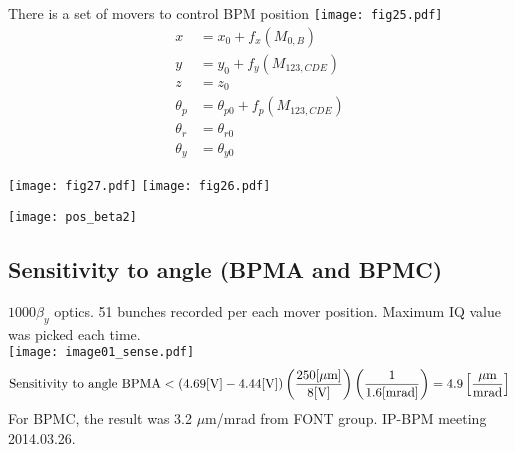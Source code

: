 {\tiny There is a set of movers to control BPM position}\vspace{-0.5cm}
\centering
\texttt{[image: fig25.pdf]} 
\begin{align*}
 x &= x_0+f_x(M_{0,B})\\
 y &= y_0+f_y(M_{123,CDE})\\
 z &= z_0\\
 \theta_p &= \theta_{p0}+f_p(M_{123,CDE})\\
 \theta_r &= \theta_{r0}\\
 \theta_y &= \theta_{y0}
\end{align*}\par
\vspace*{-0.4cm}{\tiny All initial values are set during the IP BPMs installation}
\texttt{[image: fig27.pdf]}
\texttt{[image: fig26.pdf]}


\texttt{[image: pos\_beta2]}

\subsection{Sensitivity to angle (BPMA and BPMC)}
$1000\beta_y$ optics. 51 bunches recorded per each mover position. Maximum IQ value was picked each time.\\
\centering
 \texttt{[image: image01\_sense.pdf]}\\
 \begin{equation}
  \text{Sensitivity to angle BPMA}<(4.69[\text{V}]-4.44[\text{V}])\left(\frac{250[\mu\text{m}]}{8[\text{V}]}\right)\left(\frac{1}{1.6[\text{mrad}]}\right)=4.9\left[\frac{\mu\textmd{m}}{\textmd{mrad}}\right]
 \end{equation}
 For BPMC, the result was 3.2 $\mu$m/mrad from FONT group. IP-BPM meeting 2014.03.26.
\raggedright

